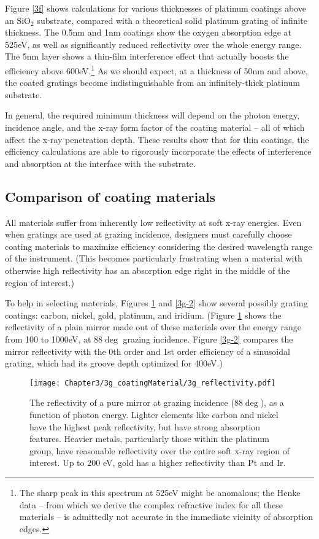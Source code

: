 Figure \ref{3f} shows calculations for various thicknesses of platinum coatings above an SiO$_2$ substrate, compared with a theoretical solid platinum grating of infinite thickness.  The 0.5nm and 1nm coatings show the oxygen absorption edge at 525eV, as well as significantly reduced reflectivity over the whole energy range.  The 5nm layer shows a thin-film interference effect that actually boosts the efficiency above 600eV.\footnote{The sharp peak in this spectrum at 525eV might be anomalous; the Henke data -- from which we derive the complex refractive index for all these materials -- is admittedly not accurate in the immediate vicinity of absorption edges.}  As we should expect, at a thickness of 50nm and above, the coated gratings become indistinguishable from an infinitely-thick platinum substrate.  

In general, the required minimum thickness will depend on the photon energy, incidence angle, and the x-ray form factor of the coating material -- all of which affect the x-ray penetration depth.  These results show that for thin coatings, the efficiency calculations are able to rigorously incorporate the effects of interference and absorption at the interface with the substrate.

\subsection{Comparison of coating materials}
All materials suffer from inherently low reflectivity at soft x-ray energies.  Even when gratings are used at grazing incidence, designers must carefully choose coating materials to maximize efficiency considering the desired wavelength range of the instrument.  (This becomes particularly frustrating when a material with otherwise high reflectivity has an absorption edge right in the middle of the region of interest.)

To help in selecting materials, Figures \ref{3g} and \ref{3g-2} show several possibly grating coatings: carbon, nickel, gold, platinum, and iridium.  (Figure \ref{3g} shows the reflectivity of a plain mirror made out of these materials over the energy range from 100 to  1000eV, at 88$\deg$ grazing incidence.  Figure \ref{3g-2} compares the mirror reflectivity with the 0th order and 1st order efficiency of a sinusoidal grating, which had its groove depth optimized for 400eV.)

\begin{figure}[htbp] %
   \centering
   \texttt{[image: Chapter3/3g\_coatingMaterial/3g\_reflectivity.pdf]} 
   \caption{The reflectivity of a pure mirror at grazing incidence (88$\deg$), as a function of photon energy.  Lighter elements like carbon and nickel have the highest peak reflectivity, but have strong absorption features.  Heavier metals, particularly those within the platinum group, have reasonable reflectivity over the entire soft x-ray region of interest.  Up to 200 eV, gold has a higher reflectivity than Pt and Ir. }
   \label{3g}
\end{figure}

